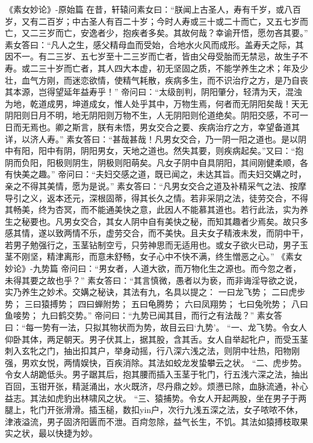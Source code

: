 \documentclass[12pt,UTF8]{ctexbook}
\begin{document}
《素女妙论》-原始篇
在昔，轩辕问素女曰：“朕闻上古圣人，寿有千岁，或八百岁，又有二百岁；中古圣人有百二十岁；今时人寿或三十或二十而亡，又五七岁而亡，又二三岁而亡，安逸者少，抱疾者多矣。其故何哉？幸谕开悟，愿勿吝其要。”
素女答曰：“凡人之生，感父精母血而受始，合地水火风而成形。盖寿夭之际，其因不一。有二三岁、五七岁至十二三岁而亡者，皆由父母受胎而无禁忌，故生子不寿。或二三十岁而亡者，其人四大本虚，初无坚固之质，不能学养生之术；年及少壮，血气方刚，而迷恋欲情，使精气耗散，疾病多生，而不识治疗之方，是乃自丧其本源，岂得望延年益寿乎！”
帝问曰：“太级剖判，阴阳肇分，轻清为天，混浊为地，乾道成男，坤道成女，惟人处乎其中，万物生焉，何者而无阴阳矣哉！天无阴阳则日月不明，地无阴阳则万物不生，人无阴阳则伦道绝矣。阴阳交感，不可一日而无焉也。卿之斯言，朕有未悟，男女交合之要、疾病治疗之方，幸望备道其详，以济人寿。”
素女答曰：“甚哉甚哉！凡男女交合，乃一阴一阳之道也。是以阴中有阳，阳中有阴，阴阳男女，天地之道也。然失其要，则疾病起矣。”又曰：“抱阴而负阳，阳极则阴生，阴极则阳萌矣。凡女子阴中自具阴阳，其间刚健柔顺，各有快美之趣。”
帝问曰：“夫妇交感之道，既已闻之，未达其旨。而夫妇交媾之时，亲之不得其美情，愿为是说。”
素女答曰：“凡男女交合之道及补精采气之法、按摩导引之义，返本还元，深根固蒂，得其长久之情。若非采阴之法，徒劳交合，不得其畅美，终为杏冥，而不能通美快之意，此因人不能慕其道也。若行此法，实为养生之秘要也。凡男女交合，其女人阴中自有美快之秘，而知其趣者少焉矣。故只多感其情，遂以致两情不乐，虚劳交合，而不美快。且夫女子精液未发，而阴中干，若男子勉强行之，玉茎钻制空亏，只劳神思而无适用也。或女子欲火已动，男子玉茎不刚坚，精津离形，而意未舒畅，女子心中不快不满，终生憎恶之心。”
《素女妙论》-九势篇
帝问曰：“男女者，人道大欲，而万物化生之源也。而今忽之者，未得其要之故也乎？”
素女答曰：“其言慎微，愚者以为亵，而非诲淫导欲之说，实乃养生之妙术。交媾之秘诀，其法有九，名具以提之：
一曰龙飞势；
二曰虎步势；
三曰猿搏势；
四曰蝉附势；
五曰龟腾势；
六曰凤翔势；
七曰兔吮势；
八曰鱼唼势；
九曰鹤交势。”
帝问曰：“九势已闻其目，而行之有法哉？”
素女答曰：“每一势有一法，只拟其物状而为势，故目云曰‘九势’。
“一、龙飞势。令女人仰卧其体，两足朝天。男子伏其上，据其股，含其舌。女人自举起牝户，而受玉茎刺入玄牝之门，抽出扣其户，举身动摇，行八深六浅之法，则阴中壮热，阳物刚强，男欢女悦，两情娱快，百疾消除。其法如蛟龙发蛰攀云之状。
“二、虎步势。令女人胡跪低头。男子踞其后，抱其腰而插入玉茎于牝门，行五浅六深之法，抽出百回，玉钳开张，精涎涌出，水火既济，尽丹鼎之妙。烦懑已除，血脉流通，补心益志。其法如虎豹出林啸风之状。
“三、猿捕势。令女人开起两股，坐在男子于两腿上，牝门开张滑滑。插玉槌，数扣yin户，次行九浅五深之法，女子哝哝不休，津液溢流，男子固济阳匮而不泄。百疴忽除，益气长生，不饥。其法如猿搏枝取果实之状，最以快捷为妙。
\end{document}
